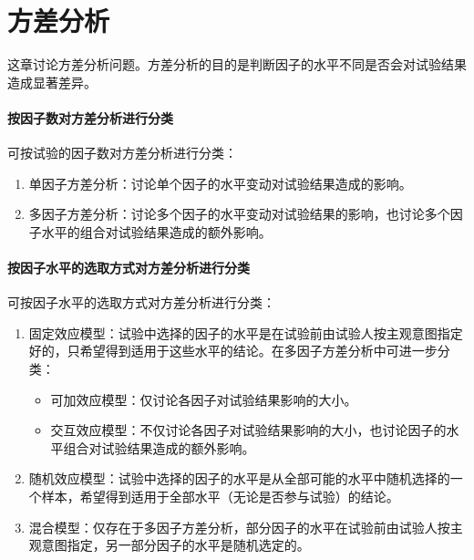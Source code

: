 \chapter{方差分析}

这章讨论方差分析问题。方差分析的目的是判断因子的水平不同是否会对试验结果造成显著差异。
\subsubsection{按因子数对方差分析进行分类}
可按试验的因子数对方差分析进行分类：
\begin{enumerate}
	\item 单因子方差分析：讨论单个因子的水平变动对试验结果造成的影响。
	\item 多因子方差分析：讨论多个因子的水平变动对试验结果的影响，也讨论多个因子水平的组合对试验结果造成的额外影响。
\end{enumerate}
\subsubsection{按因子水平的选取方式对方差分析进行分类}
可按因子水平的选取方式对方差分析进行分类：
\begin{enumerate}
	\item 固定效应模型：试验中选择的因子的水平是在试验前由试验人按主观意图指定好的，只希望得到适用于这些水平的结论。在多因子方差分析中可进一步分类：
	\begin{itemize}
		\item 可加效应模型：仅讨论各因子对试验结果影响的大小。
		\item 交互效应模型：不仅讨论各因子对试验结果影响的大小，也讨论因子的水平组合对试验结果造成的额外影响。
	\end{itemize}
	\item 随机效应模型：试验中选择的因子的水平是从全部可能的水平中随机选择的一个样本，希望得到适用于全部水平（无论是否参与试验）的结论。
	\item 混合模型：仅存在于多因子方差分析，部分因子的水平在试验前由试验人按主观意图指定，另一部分因子的水平是随机选定的。
\end{enumerate}







